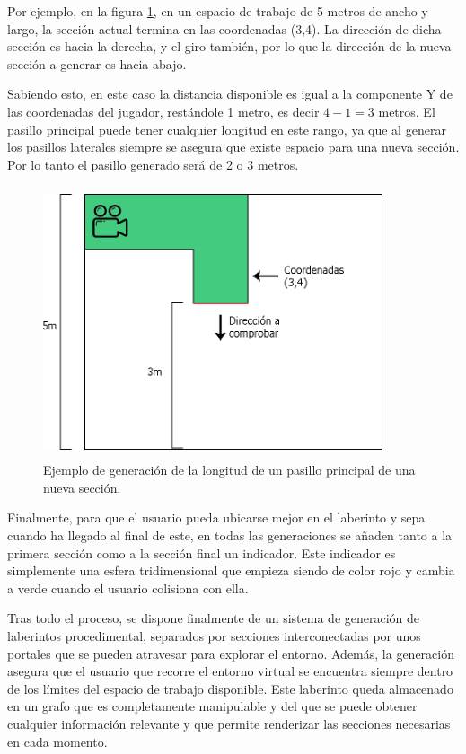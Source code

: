 \documentclass[../main.tex]{subfiles}
\begin{document}
Por ejemplo, en la figura \ref{fig:Straight_Hallway_Generation}, en un espacio de trabajo de 5 metros de ancho y largo, la sección actual termina en las coordenadas (3,4). La dirección de dicha sección es hacia la derecha, y el giro también, por lo que la dirección de la nueva sección a generar es hacia abajo.

Sabiendo esto, en este caso la distancia disponible es igual a la componente Y de las coordenadas del jugador, restándole 1 metro, es decir $4-1 = 3$ metros. El pasillo principal puede tener cualquier longitud en este rango, ya que al generar los pasillos laterales siempre se asegura que existe espacio para una nueva sección. Por lo tanto el pasillo generado será de 2 o 3 metros.

\begin{figure}[h!]
\centering
\includegraphics[width=10cm,height=8cm]{imagenes/Straight_Hallway_Generation.png}
\caption{Ejemplo de generación de la longitud de un pasillo principal de una nueva sección.}
\label{fig:Straight_Hallway_Generation}
\end{figure}

Finalmente, para que el usuario pueda ubicarse mejor en el laberinto y sepa cuando ha llegado al final de este, en todas las generaciones se añaden tanto a la primera sección como a la sección final un indicador. Este indicador es simplemente una esfera tridimensional que empieza siendo de color rojo y cambia a verde cuando el usuario colisiona con ella.

Tras todo el proceso, se dispone finalmente de un sistema de generación de laberintos procedimental, separados por secciones interconectadas por unos portales que se pueden atravesar para explorar el entorno. Además, la generación asegura que el usuario que recorre el entorno virtual se encuentra siempre dentro de los límites del espacio de trabajo disponible. Este laberinto queda almacenado en un grafo que es completamente manipulable y del que se puede obtener cualquier información relevante y que permite renderizar las secciones necesarias en cada momento.
\end{document}
